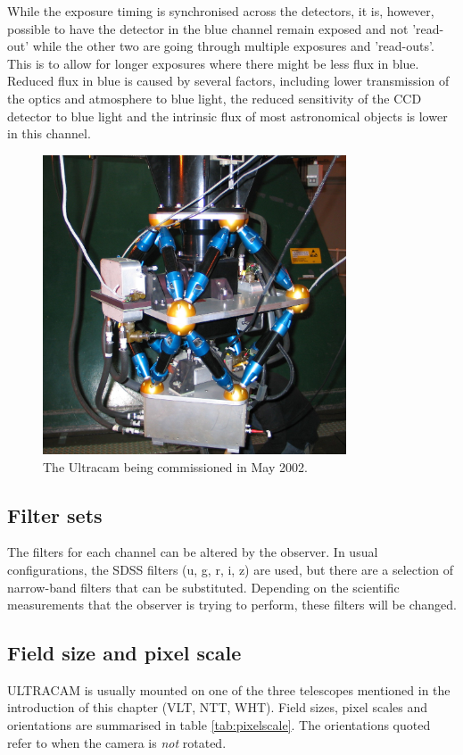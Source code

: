 While the exposure timing is synchronised across the detectors, it is, however, possible to have the detector in the blue channel remain exposed and not 'read-out' while the other two are going through multiple exposures and 'read-outs'. This is to allow for longer exposures where there might be less flux in blue. Reduced flux in blue is caused by several factors, including lower transmission of the optics and atmosphere to blue light, the reduced sensitivity of the CCD detector to blue light and the intrinsic flux of most astronomical objects is lower in this channel.

\begin{figure}[!h]
\centering
\includegraphics[width=90mm]{images/IMG_0121_scaled.JPG}
\caption{The Ultracam being commissioned in May 2002.}
\label{fig1}
\end{figure}

\subsection{Filter sets}
The filters for each channel can be altered by the observer. In usual configurations, the SDSS filters (u, g, r, i, z) are used, but there are a selection of narrow-band filters that can be substituted. Depending on the scientific measurements that the observer is trying to perform, these filters will be changed.   

\subsection{Field size and pixel scale}
ULTRACAM is usually mounted on one of the three telescopes mentioned in the introduction of this chapter (VLT, NTT, WHT). Field sizes, pixel scales and orientations are summarised in table \ref{tab:pixelscale}. The orientations quoted refer to when the camera is \emph{not} rotated. 

